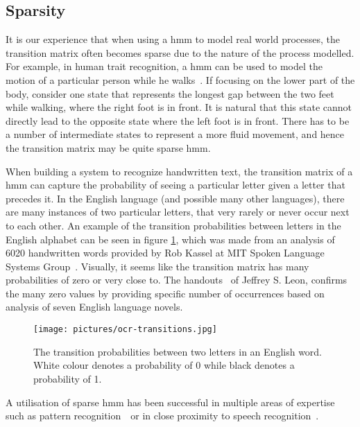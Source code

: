 \subsection{Sparsity}
\label{sec:hmm-and-sparsity}
It is our experience that when using a \gls{hmm} to model real world processes, the transition matrix often becomes sparse due to the nature of the process modelled.
For example, in human trait recognition, a \gls{hmm} can be used to model the motion of a particular person while he walks~\cite{trait-recognition}.
If focusing on the lower part of the body, consider one state that represents the longest gap between the two feet while walking, where the right foot is in front. It is natural that this state cannot directly lead to the opposite state where the left foot is in front. There has to be a number of intermediate states to represent a more fluid movement, and hence the transition matrix may be quite sparse \gls{hmm}.

When building a system to recognize handwritten text, the transition matrix of a \gls{hmm} can capture the probability of seeing a particular letter given a letter that precedes it.
In the English language (and possible many other languages), there are many instances of two particular letters, that very rarely or never occur next to each other. An example of the transition probabilities between letters in the English alphabet can be seen in figure \ref{fig:ocr-transitions}, which was made from an analysis of 6020 handwritten words provided by Rob Kassel at MIT Spoken Language Systems Group~\cite{thomas-letter-pair-analysis-picture}. Visually, it seems like the transition matrix has many probabilities of zero or very close to. The handouts~\cite{leon-letter-pair-analysis-handouts} of Jeffrey S. Leon, confirms the many zero values by providing specific number of occurrences based on analysis of seven English language novels.

\begin{figure}
	\begin{centering}
		\texttt{[image: pictures/ocr-transitions.jpg]}
		\caption{The transition probabilities between two letters in an English word. White colour denotes a probability of 0 while black denotes a probability of 1.}
		\label{fig:ocr-transitions}
	\end{centering}
\end{figure}

A utilisation of sparse \gls{hmm} has been successful in multiple areas of expertise such as pattern recognition~\cite{bicego2007}~or in close proximity to speech recognition~\cite{roweis1999}.